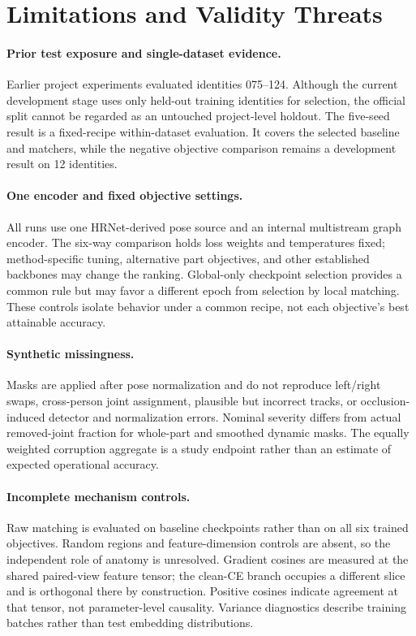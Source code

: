 \documentclass[pdflatex,iicol,sn-apa]{sn-jnl}
\begin{document}
\section{Limitations and Validity Threats}

\paragraph{Prior test exposure and single-dataset evidence.}
Earlier project experiments evaluated identities 075--124. Although the current
development stage uses only held-out training identities for selection, the
official split cannot be regarded as an untouched project-level holdout. The
five-seed result is a fixed-recipe within-dataset evaluation. It covers the
selected baseline and matchers, while the negative objective comparison
remains a development result on 12 identities.

\paragraph{One encoder and fixed objective settings.}
All runs use one HRNet-derived pose source and an internal multistream graph
encoder. The six-way comparison holds loss weights and temperatures fixed;
method-specific tuning, alternative part objectives, and other established
backbones may change the ranking. Global-only checkpoint selection provides a
common rule but may favor a different epoch from selection by local matching.
These controls isolate behavior under a common recipe, not each objective's
best attainable accuracy.

\paragraph{Synthetic missingness.}
Masks are applied after pose normalization and do not reproduce left/right
swaps, cross-person joint assignment, plausible but incorrect tracks, or
occlusion-induced detector and normalization errors. Nominal severity differs
from actual removed-joint fraction for whole-part and smoothed dynamic masks.
The equally weighted corruption aggregate is a study endpoint rather than an
estimate of expected operational accuracy.

\paragraph{Incomplete mechanism controls.}
Raw matching is evaluated on baseline checkpoints rather than on all six
trained objectives. Random regions and feature-dimension controls are absent,
so the independent role of anatomy is unresolved. Gradient cosines are measured
at the shared paired-view feature tensor; the clean-CE branch occupies a
different slice and is orthogonal there by construction. Positive cosines
indicate agreement at that tensor, not parameter-level causality. Variance
diagnostics describe training batches rather than test embedding distributions.
\end{document}
